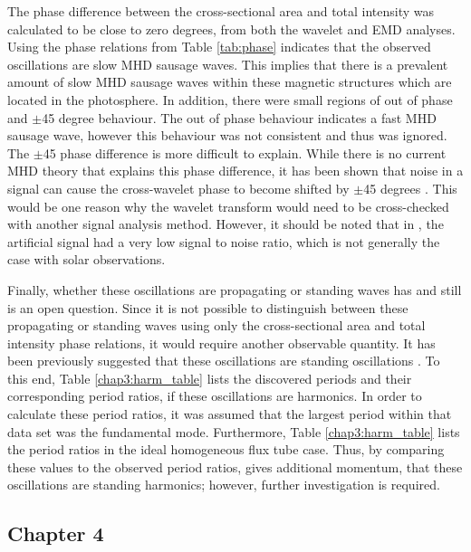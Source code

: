     The phase difference between the cross-sectional area and total intensity was calculated to be close to zero degrees, from both the wavelet and EMD analyses.
    Using the phase relations from Table \ref{tab:phase} indicates that the observed oscillations are slow MHD sausage waves. 
    This implies that there is a prevalent amount of slow MHD sausage waves within these magnetic structures which are located in the photosphere.
    In addition, there were small regions of out of phase and $\pm$45 degree behaviour.
    The out of phase behaviour indicates a fast MHD sausage wave, however this behaviour was not consistent and thus was ignored. 
    The $\pm$45 phase difference is more difficult to explain.
    While there is no current MHD theory that explains this phase difference, it has been shown that noise in a signal can cause the cross-wavelet phase to become shifted by $\pm$45 degrees \citep{2015A&A...579A..73M}.
    This would be one reason why the wavelet transform would need to be cross-checked with another signal analysis method.
    However, it should be noted that in \cite{2015A&A...579A..73M}, the artificial signal had a very low signal to noise ratio, which is not generally the case with solar observations. 
    
    Finally, whether these oscillations are propagating or standing waves has and still is an open question. 
    Since it is not possible to distinguish between these propagating or standing waves using only the cross-sectional area and total intensity phase relations, it would require another observable quantity.
    It has been previously suggested that these oscillations are standing oscillations \citep{morton2011}.
    To this end, Table \ref{chap3:harm_table} lists the discovered periods and their corresponding period ratios, if these oscillations are harmonics.
    In order to calculate these period ratios, it was assumed that the largest period within that data set was the fundamental mode. 
    Furthermore, Table \ref{chap3:harm_table} lists the period ratios in the ideal homogeneous flux tube case.       
    Thus, by comparing these values to the observed period ratios, gives additional momentum, that these oscillations are standing harmonics; however, further investigation is required.
    
    \subsection{Chapter 4}
    	
